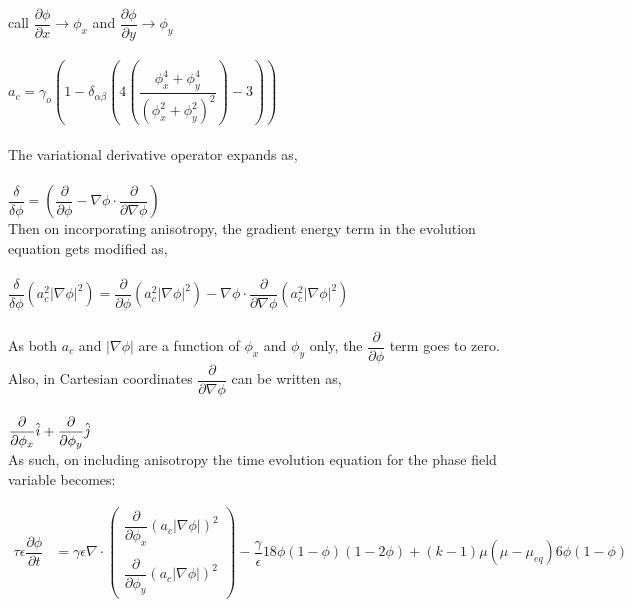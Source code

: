 \documentclass[a4paper]{report}
\begin{document}
\\
call $ \dfrac{\partial \phi}{\partial x} \rightarrow \phi_x $ and $\dfrac{\partial \phi}{\partial y} \rightarrow \phi_y$\\
\\
$a_c = \gamma_o\left(1 - \delta_{\alpha\beta}\left(4\left(\dfrac{\phi_x^4 + \phi_y^4}{\left(
\phi_x^2 + \phi_y^2\right)^2}\right)
 - 3\right)\right)$\\
\\
The variational derivative operator expands as, \\
\\
$\dfrac{\delta}{\delta\phi} = \left(\dfrac{\partial}{\partial\phi} -
 \nabla\phi\cdot\dfrac{\partial}{\partial\nabla\phi}\right)$
\\
Then on incorporating anisotropy, the gradient energy term in the evolution equation 
gets modified as, \\
\\
$\dfrac{\delta}{\delta\phi}\left(a_c^2|\nabla\phi|^2\right) = 
 \dfrac{\partial}{\partial\phi}\left(a_c^2|\nabla\phi|^2\right) -
 \nabla\phi\cdot\dfrac{\partial}{\partial\nabla\phi}\left(a_c^2|\nabla\phi|^2\right)
$\\
\\
As both $a_c$ and $|\nabla\phi|$ are a function of $\phi_x$ and $\phi_y$ only,
the $\dfrac{\partial}{\partial\phi}$ term goes to zero. Also, in Cartesian 
coordinates $\dfrac{\partial}{\partial\nabla\phi}$ can be written as,\\
\\
$\dfrac{\partial}{\partial\phi_x}\hat{i}+\dfrac{\partial}{\partial\phi_y}\hat{j}\\
$
\\
As such, on including anisotropy the time evolution equation for the phase field variable becomes: 

\begin{align}
\tau\epsilon\dfrac{\partial\phi}{\partial t} &= \gamma\epsilon\nabla\cdot
\begin{pmatrix}
	\dfrac{\partial}{\partial \phi_x}\left(a_c|\nabla\phi|\right)^2\\
	\\
	\dfrac{\partial}{\partial \phi_y}\left(a_c|\nabla\phi|\right)^2
\end{pmatrix}
-\dfrac{\gamma}{\epsilon}18\phi(1-\phi)(1-2\phi) +(k - 1)\mu\left(\mu-\mu_{eq}\right)6\phi\left(1-\phi\right)
\label{phi_evolution_aniso}
\end{align}
\end{document}

